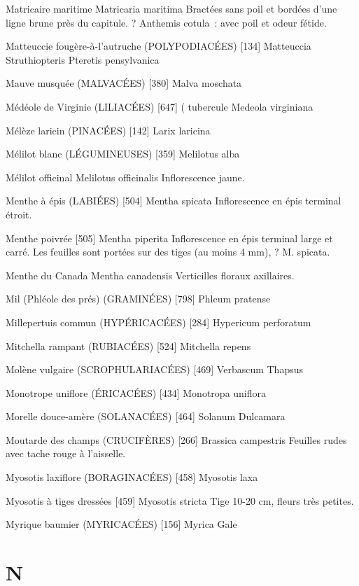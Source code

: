\documentclass[book,12pt,a4paper,onecolumn,openany]{memoir}
\begin{document}
Matricaire maritime
				Matricaria maritima
Bractées sans poil et bordées d’une ligne brune près du capitule.
? Anthemis cotula : avec poil et odeur fétide.

Matteuccie fougère-à-l’autruche (POLYPODIACÉES)  [134]
				Matteuccia Struthiopteris
				Pteretis pensylvanica

Mauve musquée (MALVACÉES)  [380]
				Malva moschata

Médéole de Virginie (LILIACÉES)  [647]			( tubercule
				Medeola virginiana

Mélèze laricin (PINACÉES) [142]
				Larix laricina

Mélilot blanc (LÉGUMINEUSES)  [359]
				Melilotus alba

Mélilot officinal
				Melilotus officinalis
Inflorescence jaune.

Menthe à épis (LABIÉES)  [504]
				Mentha spicata
Inflorescence en épis terminal étroit.

Menthe poivrée  [505]
				Mentha piperita
Inflorescence en épis terminal large et carré. Les feuilles sont portées sur des tiges (au moins 4 mm), ? M. spicata.

Menthe du Canada
				Mentha canadensis
Verticilles floraux axillaires.

Mil (Phléole des prés) (GRAMINÉES)  [798]
				Phleum pratense

Millepertuis commun (HYPÉRICACÉES)  [284]
				Hypericum perforatum

Mitchella rampant (RUBIACÉES)  [524]
				Mitchella repens

Molène vulgaire (SCROPHULARIACÉES)  [469]
				Verbascum Thapsus

Monotrope uniflore (ÉRICACÉES)  [434]
				Monotropa uniflora

Morelle douce-amère (SOLANACÉES)  [464]
				Solanum Dulcamara

Moutarde des champs (CRUCIFÈRES)  [266]
				Brassica campestris
Feuilles rudes avec tache rouge à l’aisselle.

Myosotis laxiflore (BORAGINACÉES)  [458]
				Myosotis laxa

Myosotis à tiges dressées  [459]
				Myosotis stricta
Tige 10-20 cm, fleurs très petites.

Myrique baumier (MYRICACÉES)  [156]
				Myrica Gale

\chapter*{N}
\end{document}
